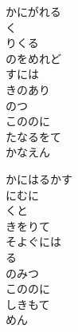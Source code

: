 \documentclass[10pt,b5j]{tarticle} %
\begin{document}
\vspace{1.5em} %
\newcommand{\linespace}{0.5em} %
\newcommand{\blocksize}{0.5\hsize} %
\begin{enumerate} %
    \begin{minipage}[c]{\blocksize}
    
        \vspace{\linespace}
        \item
        かにがれる\\
        く\\
        りくる\\
        のをめれど\\
        すには\\
        きのあり\\
        のつ\\
        こののに\\
        たなるをて\\
        かなえん
        
        \vspace{\linespace}
        \item
        かにはるかす\\
        にむに\\
        くと\\
        きをりて\\
        そよぐには\\
        る\\
        のみつ\\
        こののに\\
        しきもて\\
        めん
        

\end{minipage}
\end{enumerate}
\end{document}
